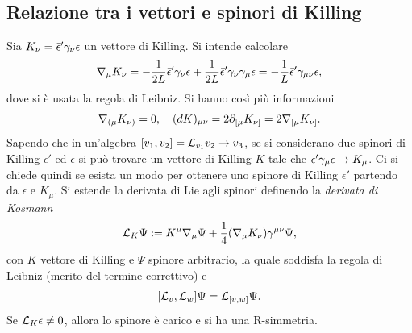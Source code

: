 \subsection{Relazione tra i vettori e spinori di Killing}
Sia $K_\nu = \bar{\epsilon}'\gamma_\nu\epsilon$ un vettore di Killing. Si intende calcolare 
\begin{equation}
    \nabla_\mu K_\nu = -\frac{1}{2L}\bar{\epsilon}'\gamma_\nu\epsilon + \frac{1}{2L}\bar{\epsilon}'\gamma_\nu\gamma_\mu\epsilon = -\frac{1}{L}\bar{\epsilon}'\gamma_{\mu\nu}\epsilon,
\end{equation}
dove si è usata la regola di Leibniz. Si hanno così più informazioni 
\begin{equation}
    \nabla_{(\mu}K_{\nu)} = 0,\quad (dK)_{\mu\nu} = 2\partial_{[\mu}K_{\nu]} = 2\nabla_{[\mu}K_{\nu]}.
\end{equation}
Sapendo che in un'algebra $[v_1,v_2] = \mathcal{L}_{v_1}v_2 \to v_3$, se si considerano due spinori di Killing $\epsilon'$ ed $\epsilon$ si può trovare un vettore di Killing $K$ tale che $\bar{\epsilon}'\gamma_\mu\epsilon \to K_\mu$. Ci si chiede quindi se esista un modo per ottenere uno spinore di Killing $\epsilon'$ partendo da $\epsilon$ e $K_\mu$. Si estende la derivata di Lie agli spinori definendo la \emph{derivata di Kosmann}
\begin{equation}
    \mathcal{L}_K\Psi := K^\mu\nabla_\mu\Psi + \frac{1}{4}(\nabla_\mu K_\nu)\gamma^{\mu\nu}\Psi,
\end{equation}
con $K$ vettore di Killing e $\Psi$ spinore arbitrario, la quale soddisfa la regola di Leibniz (merito del termine correttivo) e 
\begin{equation}
    [\mathcal{L}_v,\mathcal{L}_w]\Psi = \mathcal{L}_{[v,w]}\Psi.
\end{equation}
Se $\mathcal{L}_K\epsilon \neq 0$, allora lo spinore è carico e si ha una R-simmetria. 


